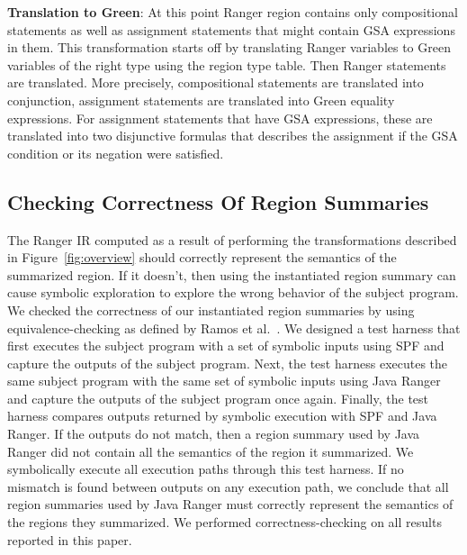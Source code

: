 \textbf{Translation to Green}:
%
At this point Ranger region contains only compositional statements as well as assignment statements that might contain GSA expressions in them.
%
This transformation starts off by translating Ranger variables to Green variables of the right type using the region type table.
%
Then Ranger statements are translated. More precisely, compositional statements are translated into conjunction, assignment statements are translated into Green equality expressions.
%
For assignment statements that have GSA expressions, these are translated into two disjunctive formulas that describes the assignment if the GSA condition or its negation were satisfied. \\

\subsection{Checking Correctness Of Region Summaries}
The Ranger IR computed as a result of performing the transformations described in Figure~\ref{fig:overview} should
correctly represent the semantics of the summarized region.
%
If it doesn't, then using the instantiated region summary can cause symbolic exploration to explore the wrong behavior
of the subject program.
%
We checked the correctness of our instantiated region summaries by using equivalence-checking as defined by Ramos et al.~\cite{ramos}.
%
We designed a test harness that first executes the subject program with a set of symbolic inputs using SPF and
capture the outputs of the subject program.
%
Next, the test harness executes the same subject program with the same set of symbolic inputs using Java Ranger and
capture the outputs of the subject program once again.
%
Finally, the test harness compares outputs returned by symbolic execution with SPF and Java Ranger.
%
If the outputs do not match, then a region summary used by Java Ranger did not contain all the semantics
of the region it summarized.
%
We symbolically execute all execution paths through this test harness.
%
If no mismatch is found between outputs on any execution path, we conclude that all region summaries used by Java Ranger
must correctly represent the semantics of the regions they summarized.
%
We performed correctness-checking on all results reported in this paper.
